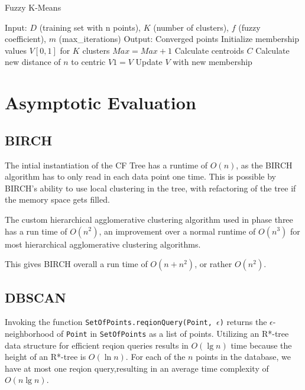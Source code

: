 \documentclass[conference, 10pt]{IEEEtran}
\begin{document}
\begin{algorithm}
\caption{Fuzzy K-Means}
\begin{algorithmic}[1]
\State Input: $D$ (training set with n points), $K$ (number of clusters), $f$ (fuzzy coefficient), $m$ (max\_iterations)
\State Output: Converged points
  \State Initialize membership values $V[0,1]$ for $K$ clusters
  \State $Max=Max+1$
        \State Calculate centroids $C$
        \State Calculate new distance of $n$ to centric
        \State $V1 = V$
        \State Update $V$ with new membership
    \EndFor
  \EndFor
\EndProcedure
\Statex
\end{algorithmic}
\end{algorithm}


\section{Asymptotic Evaluation}

\subsection{BIRCH}
The intial instantiation of the CF Tree has a runtime of $O(n)$, as the BIRCH algorithm has to only read in each data point one time. This is possible by BIRCH's ability to use local clustering in the tree, with refactoring of the tree if the memory space gets filled.

The custom hierarchical agglomerative clustering algorithm used in phase three has a run time of $O(n^2)$, an improvement over a normal runtime of $O(n^3)$ for most hierarchical agglomerative clustering algorithms.

This gives BIRCH overall a run time of $O(n+n^2)$, or rather $O(n^2)$.
\subsection{DBSCAN}

Invoking the function \texttt{SetOfPoints.reqionQuery(Point, $\epsilon$)} returns the $\epsilon$-neighborhood of \texttt{Point} in \texttt{SetOfPoints} as a list of points. Utilizing an R*-tree data structure for efficient reqion queries results in $O(\lg{n})$ time because the height of an R*-tree is $O(\ln{n})$. For each of the $n$ points in the database, we have at most one reqion query,resulting in an average time complexity of $O(n \lg{n})$. \cite{dbscan}
\end{document}

